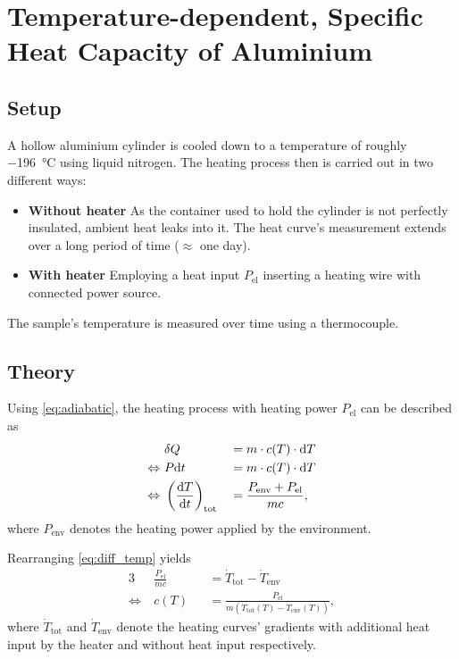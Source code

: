 \chapter{Temperature-dependent, Specific Heat Capacity of Aluminium}
\section{Setup}
A hollow aluminium cylinder is cooled down to a temperature of roughly \SI{-196}{\celsius} using liquid nitrogen.
The heating process then is carried out in two different ways:	
\begin{itemize}
	\item \textbf{Without heater} As the container used to hold the cylinder is not perfectly insulated, ambient heat leaks into it. The heat curve's measurement extends over a long period of time ($\approx$ one day).
	\item \textbf{With heater} Employing a heat input $P_\text{el}$ inserting a heating wire with connected power source.
\end{itemize}
The sample's temperature is measured over time using a thermocouple.

\section{Theory}
Using \autoref{eq:adiabatic}, the heating process with heating power $P_\text{el}$ can be described as
\begin{alignat}{3}
										&\delta Q 																	&&= m\cdot c(T)\cdot\text{d} T \nonumber \\
	\Leftrightarrow\ 	&P\text{d} t																			&&= m\cdot c(T)\cdot\text{d} T \nonumber \\
	\Leftrightarrow\ 	&\left(\frac{\text{d} T}{\text{d} t}\right)_\text{tot}	&&= \frac{P_\text{env}+P_\text{el}}{mc}, \label{eq:diff_temp}
\end{alignat}
where $P_\text{env}$ denotes the heating power applied by the environment.

Rearranging \autoref{eq:diff_temp} yields
\begin{alignat}{3}
										& \frac{P_\text{el}}{mc}	&&=\dot{T}_\text{tot}-\dot{T}_\text{env} \nonumber \\
	\Leftrightarrow\	& c(T)										&&=\frac{P_\text{el}}{m\left(\dot{T}_\text{tot}(T)-\dot{T}_\text{env}(T)\right)}, \label{eq:cap_temp}
\end{alignat}
where $\dot{T}_\text{tot}$ and $\dot{T}_\text{env}$ denote the heating curves' gradients with additional heat input by the heater and without heat input respectively.

